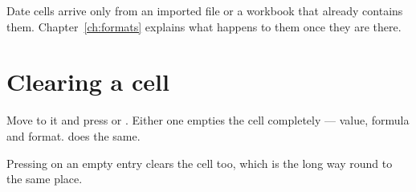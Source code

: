 Date cells arrive only from an imported  file or a
 workbook that already contains them. Chapter~\ref{ch:formats} explains what
happens to them once they are there.

\section{Clearing a cell}

Move to it and press  or . Either one empties the
cell completely --- value, formula and format.  does the
same.

Pressing  on an empty entry clears the cell too, which is the
long way round to the same place.

